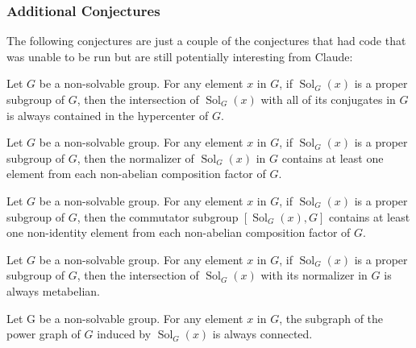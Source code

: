 \documentclass{article}
\begin{document}
\subsubsection{Additional Conjectures}\label{Additional_Conjectures}
The following conjectures are just a couple of the conjectures that had code that was unable to be run but are still potentially interesting from Claude: 
\begin{conj}
    Let \(G\) be a non-solvable group. For any element \(x\) in \(G\), if \(\operatorname{Sol}_G(x)\) is a proper subgroup of $G$, then the intersection of \(\operatorname{Sol}_G(x)\) with all of its conjugates in \(G\) is always contained in the hypercenter of \(G\).
\end{conj}
\begin{conj}
    Let \(G\) be a non-solvable group. For any element \(x\) in \(G\), if \(\operatorname{Sol}_G(x)\) is a proper subgroup of \(G\), then the normalizer of \(\operatorname{Sol}_G(x)\) in \(G\) contains at least one element from each non-abelian composition factor of \(G\).
\end{conj}
\begin{conj}
Let \(G\) be a non-solvable group. For any element \(x\) in \(G\), if \(\operatorname{Sol}_G(x)\) is a proper subgroup of \(G\), then the commutator subgroup \([\operatorname{Sol}_G(x), G]\) contains at least one non-identity element from each non-abelian composition factor of \(G\).
\end{conj}
\begin{conj}
    Let \(G\) be a non-solvable group. For any element \(x\) in \(G\), if \(\operatorname{Sol}_G(x)\) is a proper subgroup of \(G\), then the intersection of \(\operatorname{Sol}_G(x)\) with its normalizer in \(G\) is always metabelian.
\end{conj}
\begin{conj}
    Let G be a non-solvable group. For any element \(x\) in \(G\), the subgraph of the power graph of \(G\) induced by \(\operatorname{Sol}_G(x)\) is always connected.
\end{conj}
\end{document}
